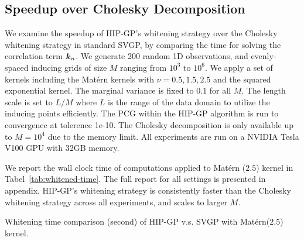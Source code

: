 \subsection{Speedup over Cholesky Decomposition}
\label{sec:experiments-whitened}
We examine the speedup of HIP-GP's whitening strategy over the
Cholesky whitening strategy in standard SVGP,
by comparing the time for solving the correlation term $\boldsymbol{k}_n$.
We generate 200 random 1D observations, and
evenly-spaced inducing grids of size $M$ ranging from $10^3$ to $10^6$.
We apply a set of kernels including the Matérn kernels with $\nu = 0.5, 1.5, 2.5$ and the
squared exponential kernel. The marginal variance is fixed to $0.1$ for all $M$.
The length scale is set to $L/M$ where $L$ is the range of the data domain to utilize the inducing points efficiently.
The PCG within the HIP-GP algorithm is run to convergence at tolerence 1e-10.
The Cholesky decomposition is only available up to $M=10^4$ due to the memory limit.
All experiments are run on a NVIDIA Tesla V100 GPU with 32GB memory.

We report the wall clock time of computations applied to Matérn ($2.5$) kernel in Tabel~\ref{tab:whitened-time}.
The full report for all settings is presented in appendix.
HIP-GP's whitening strategy is consistently  faster than the 
 Cholesky whitening strategy across all experiments, and scales to larger $M$.

\begin{table}[t!]%
  \centering
  \scalebox{.8}{}
  \caption{Whitening time comparison (second) of HIP-GP v.s. SVGP with Matérn($2.5$) kernel.}
  \label{tab:whitened-time}
\end{table}
